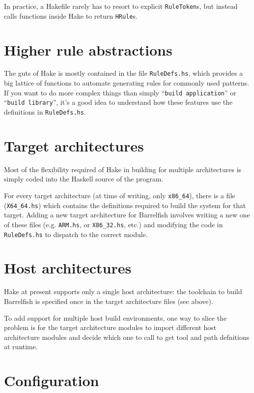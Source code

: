 \documentclass[a4paper,twoside]{report} %
\begin{document}
In practice, a Hakefile rarely has to resort to explicit
\texttt{RuleToken}s, but instead calls functions inside Hake to return
\texttt{HRule}s.  


\section{Higher rule abstractions}

The guts of Hake is mostly contained in the file \texttt{RuleDefs.hs},
which provides a big lattice of functions to automate generating
rules for commonly used patterns.  If you want to do more complex
things than simply ``\texttt{build application}'' or ``\texttt{build
  library}'', it's a good idea to understand how these features use
the definitions in \texttt{RuleDefs.hs}. 

\section{Target architectures}

Most of the flexibility required of Hake in building for multiple
architectures is simply coded into the Haskell source of the program.  

For every target architecture (at time of writing, only
\texttt{x86\_64}), there is a file (\texttt{X64\_64.hs}) which
contains the definitions required to build the system for that
target.   Adding a new target architecture for Barrelfish involves
writing a new one of these files (e.g. \texttt{ARM.hs}, or
\texttt{X86\_32.hs}, etc.) and modifying the code in
\texttt{RuleDefs.hs} to dispatch to the correct module. 

\section{Host architectures}

Hake at present supports only a single host architecture: the
toolchain to build Barrelfish is specified once in the target
architecture files (see above).  

To add support for multiple host build environments, one way to slice the
problem is for the target architecture modules to import different
host architecture modules and decide which one to call to get tool and
path defnitions at runtime. 

\section{Configuration}
\end{document}
